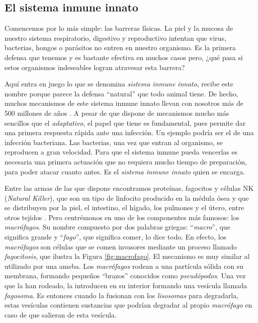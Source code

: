 \subsection{El sistema inmune innato}

Comencemos por lo más simple: las barreras físicas. La piel y la mucosa de nuestro sistema respiratorio, digestivo y reproductivo intentan que virus, bacterias, hongos o parásitos no entren en nuestro organismo. Es la primera defensa que tenemos y es bastante efectiva en muchos casos pero, ¿qué pasa si estos organismos indeseables logran atravesar esta barrera?

Aquí entra en juego lo que se denomina \textit{sistema inmune innato}, recibe este nombre porque parece la defensa ``natural'' que todo animal tiene. De hecho, muchos mecanismos de este sistema inmune innato llevan con nosotros más de 500 millones de años \citep{theHowItWorks}. A pesar de que dispone de mecanismos mucho más sencillos que el \textit{adaptativo}, el papel que tiene es fundamental, pues permite dar una primera respuesta rápida ante una infección. Un ejemplo podría ser el de una infección bacteriana. Las bacterias, una vez que entran al organismo, se reproducen a gran velocidad. Para que el sistema inmune pueda vencerlas es necesaria una primera actuación que no requiera mucho tiempo de preparación, para poder atacar cuanto antes. Es el \textit{sistema inmune innato} quien se encarga. 

Entre las armas de las que dispone encontramos proteínas, fagocitos y células NK (\textit{Natural Killer}), que son un tipo de linfocito producido en la médula ósea y que se distribuyen por la piel, el intestino, el hígado, los pulmones y el útero, entre otros tejidos \citep{celulasNK}. Pero centrémonos en uno de los componentes más famosos: los \textit{macrófagos}. Su nombre compuesto por dos palabras griegas: ``\textit{macro}'', que significa grande y ``\textit{fago}'', que significa comer, lo dice todo. En efecto, los \textit{macrófagos} son células que se comen invasores mediante un proceso llamado \textit{fagocitosis}, que ilustra la Figura \ref{fig:macrofago}. El mecanismo es muy similar al utilizado por una ameba. Los \textit{macrófagos} rodean a una partícula sólida con su membrana, formando pequeños ``brazos'' conocidos como \textit{pseudópodos}. Una vez que la han rodeado, la introducen en su interior formando una vesícula llamada \textit{fagosoma}. Es entonces cuando la fusionan con los \textit{lisosomas} para degradarla, estas vesículas contienen sustancias que podrían degradar al propio \textit{macrófago} en caso de que salieran de esta vesícula.


